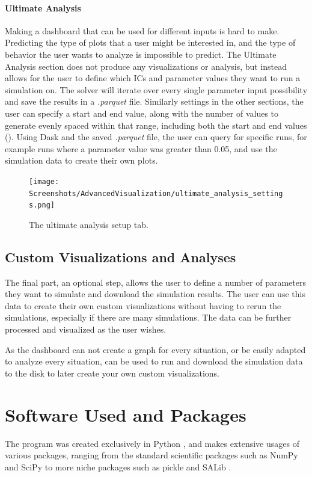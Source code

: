 \paragraph{Ultimate Analysis}
\label{sec:ultimate_analysis}
Making a dashboard that can be used for different inputs is hard to make. Predicting the type of plots that a user might be interested in, and the type of behavior the user wants to analyze is impossible to predict. 
The Ultimate Analysis section does not produce any visualizations or analysis, but instead allows for the user to define which ICs and parameter values they want to run a simulation on.
The solver will iterate over every single parameter input possibility and save the results in a \textit{.parquet} file.
Similarly settings in the other sections, the user can specify a start and end value, along with the number of values to generate evenly spaced within that range, including both the start and end values ().
\newline
Using Dask and the saved \textit{.parquet} file, the user can query for specific runs, for example runs where a parameter value was greater than 0.05, and use the simulation data to create their own plots.
\begin{figure}
    \centering
    \texttt{[image: Screenshots/AdvancedVisualization/ultimate\_analysis\_settings.png]}
    \caption{
        The ultimate analysis setup tab. 
    }
    \label{fig:ss:av:ultimate_analysis_settings}
\end{figure}

\subsection{Custom Visualizations and Analyses} 
\label{sec:custom_visualizations_and_framework}
The final part, an optional step, allows the user to define a number of parameters they want to simulate and download the simulation results. 
The user can use this data to create their own custom visualizations without having to rerun the simulations, especially if there are many simulations. 
The data can be further processed and visualized as the user wishes. 

As the dashboard can not create a graph for every situation, or be easily adapted to analyze every situation,  can be used to run and download the simulation data to the disk to later create your own custom visualizations. 

\section{Software Used and Packages}
The program was created exclusively in Python \cite{Python}, and makes extensive usages of various packages, ranging from the standard scientific packages such as NumPy \cite{NumPy} and SciPy to more niche packages such as pickle and SALib \cite{iwanagaSALib20Advancing2022, hermanSALibOpensourcePython2017}.

